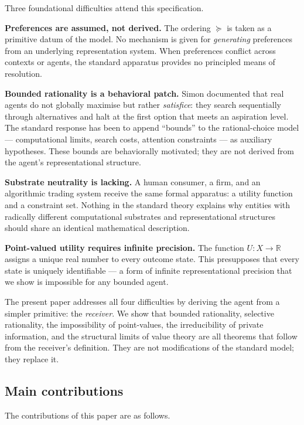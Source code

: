 \documentclass[twocolumn,11pt,a4paper]{article}
\newcommand{\R}{\mathbb{R}}
\begin{document}
Three foundational difficulties attend this specification.

\textbf{Preferences are assumed, not derived.}  The ordering $\succeq$ is
taken as a primitive datum of the model.  No mechanism is given for
\emph{generating} preferences from an underlying representation system.
When preferences conflict across contexts or agents, the standard apparatus
provides no principled means of resolution.

\textbf{Bounded rationality is a behavioral patch.}  Simon
\cite{simon1955,simon1957} documented that real agents do not globally
maximise but rather \emph{satisfice}: they search sequentially through
alternatives and halt at the first option that meets an aspiration level.
The standard response has been to append ``bounds'' to the rational-choice
model — computational limits, search costs, attention constraints — as
auxiliary hypotheses.  These bounds are behaviorally motivated; they are
not derived from the agent's representational structure.

\textbf{Substrate neutrality is lacking.}  A human consumer, a firm, and an
algorithmic trading system receive the same formal apparatus: a utility
function and a constraint set.  Nothing in the standard theory explains why
entities with radically different computational substrates and representational
structures should share an identical mathematical description.

\textbf{Point-valued utility requires infinite precision.}  The function
$U\colon X\to\R$ assigns a unique real number to every outcome state.
This presupposes that every state is uniquely identifiable — a form of
infinite representational precision that we show is impossible for any
bounded agent.

\medskip

The present paper addresses all four difficulties by deriving the agent
from a simpler primitive: the \emph{receiver}.  We show that bounded
rationality, selective rationality, the impossibility of point-values, the
irreducibility of private information, and the structural limits of value
theory are all theorems that follow from the receiver's definition.  They
are not modifications of the standard model; they replace it.

\subsection{Main contributions}
\label{sec:intro:contributions}

The contributions of this paper are as follows.
\end{document}
